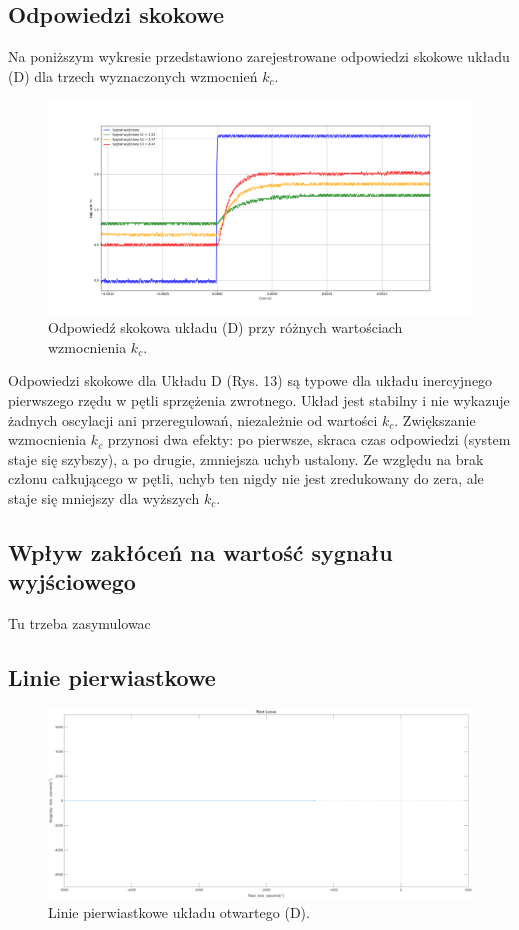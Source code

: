 \documentclass[12pt,a4paper]{article}
\begin{document}
	\subsection{Odpowiedzi skokowe}
	Na poniższym wykresie przedstawiono zarejestrowane odpowiedzi skokowe układu (D) dla trzech wyznaczonych wzmocnień \(k_c\).
	
	\begin{figure}[H]
	\centering
	\includegraphics[width=1\linewidth]{zdjecia/OdpSkokD.png}
	\caption{Odpowiedź skokowa układu (D) przy różnych wartościach wzmocnienia \(k_c\).}
	\label{fig:OdpSkokD}
	\end{figure}
	
	Odpowiedzi skokowe dla Układu D (Rys. 13) są typowe dla układu inercyjnego pierwszego rzędu w pętli sprzężenia zwrotnego. Układ jest stabilny i nie wykazuje żadnych oscylacji ani przeregulowań, niezależnie od wartości $k_c$. Zwiększanie wzmocnienia $k_c$ przynosi dwa efekty: po pierwsze, skraca czas odpowiedzi (system staje się szybszy), a po drugie, zmniejsza uchyb ustalony. Ze względu na brak członu całkującego w pętli, uchyb ten nigdy nie jest zredukowany do zera, ale staje się mniejszy dla wyższych $k_c$.
	
	\subsection{Wpływ zakłóceń na wartość sygnału wyjściowego}
	
		Tu trzeba zasymulowac
		
	
	\subsection{Linie pierwiastkowe}
	
	\begin{figure}[H]
		\centering
		\includegraphics[width=0.8\linewidth]{zdjecia/LP_ukladD.png}
		\caption{Linie pierwiastkowe układu otwartego (D).}
		\label{fig:LP_ukladD}
	\end{figure}
	
\end{document}
